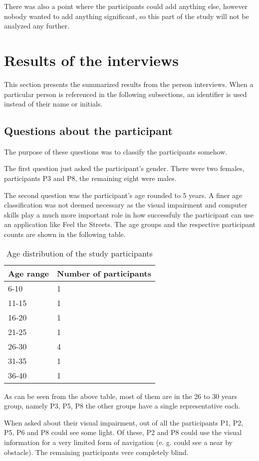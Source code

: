 \documentclass[nolof,digital]{fithesis3}
\begin{document}
There was also a point where the participants could add anything else, however nobody wanted to add anything significant, so this part of the study will not be analyzed any further.
\section{Results of the interviews}
This section presents the summarized results from the person interviews. When a particular person is referenced in the following subsections, an identifier is used instead of their name or initials.
\subsection{Questions about the participant}
The purpose of these questions was to classify the participants somehow.

The first question just asked the participant's gender. There were two females, participants P3 and P8, the remaining eight were males.

The second question was the participant's age rounded to 5 years. A finer age classification was not deemed necessary as the visual impairment and computer skills play a much more important role in how successfuly the participant can use an application like Feel the Streets. The age groups and the respective participant counts are shown in the following table.

\begin{table}
\caption{Age distribution of the study participants}
\begin{tabularx}{\textwidth}{ |X|X| }
Age range & Number of participants \\
\hline
6-10 & 1 \\
11-15 & 1 \\
16-20 & 1 \\
21-25  & 1 \\
26-30 & 4 \\
31-35 & 1 \\
36-40 & 1 \\
\end{tabularx}
\end{table}
As can be seen from the above table, most of them are in the 26 to 30 years group, namely P3, P5, P8 the other groups have a single representative each.

When asked about their visual impairment, out of all the participants P1, P2, P5, P6 and P8 could see some light. Of these, P2 and P8 could use the visual information for a very limited form of navigation (e. g. could see a near by obstacle). The remaining participants vere completely blind.
\end{document}
